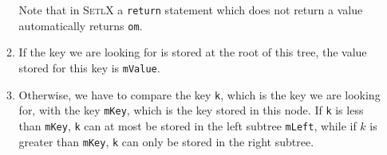 \begin{enumerate}
\begin{enumerate}
            Note that in \textsc{SetlX} a \texttt{return} statement which does not return a value 
            automatically returns \texttt{om}.
      \item If the key we are looking for is stored at the root of this tree, the value stored for
            this key is \texttt{mValue}.
      \item Otherwise, we have to compare the key \texttt{k}, which is the key we are looking for,
            with the key \texttt{mKey}, which is the key stored in this node.  If \texttt{k}
            is less than \texttt{mKey}, \texttt{k} can at most be stored in the left subtree
            \texttt{mLeft}, while if $k$ is greater than \texttt{mKey}, \texttt{k} can only be
            stored in the right subtree.
      \end{enumerate}



\end{enumerate}
